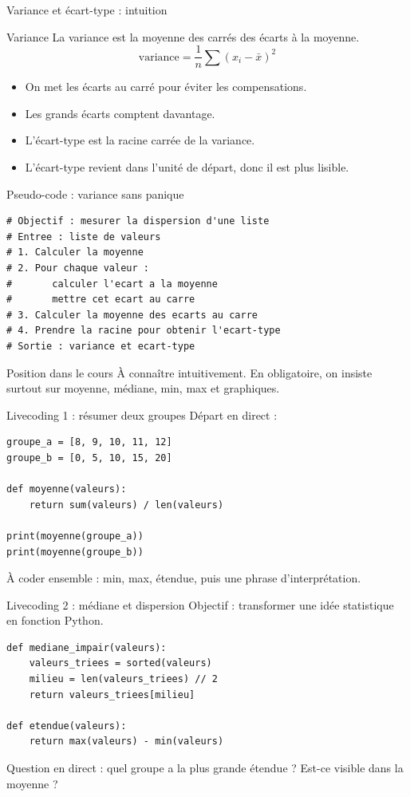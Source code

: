 \documentclass[10pt,aspectratio=169]{beamer}
\begin{document}
\begin{frame}{Variance et écart-type : intuition}
\begin{block}{Variance}
La variance est la moyenne des carrés des écarts à la moyenne.
\[
\text{variance} = \frac{1}{n}\sum (x_i - \bar{x})^2
\]
\end{block}
\begin{itemize}
  \item On met les écarts au carré pour éviter les compensations.
  \item Les grands écarts comptent davantage.
  \item L'écart-type est la racine carrée de la variance.
  \item L'écart-type revient dans l'unité de départ, donc il est plus lisible.
\end{itemize}
\end{frame}

\begin{frame}[fragile]{Pseudo-code : variance sans panique}
\begin{lstlisting}
# Objectif : mesurer la dispersion d'une liste
# Entree : liste de valeurs
# 1. Calculer la moyenne
# 2. Pour chaque valeur :
#       calculer l'ecart a la moyenne
#       mettre cet ecart au carre
# 3. Calculer la moyenne des ecarts au carre
# 4. Prendre la racine pour obtenir l'ecart-type
# Sortie : variance et ecart-type
\end{lstlisting}
\begin{block}{Position dans le cours}
À connaître intuitivement. En obligatoire, on insiste surtout sur moyenne, médiane, min, max et graphiques.
\end{block}
\end{frame}

\begin{frame}[fragile]{Livecoding 1 : résumer deux groupes}
Départ en direct :
\begin{lstlisting}
groupe_a = [8, 9, 10, 11, 12]
groupe_b = [0, 5, 10, 15, 20]

def moyenne(valeurs):
    return sum(valeurs) / len(valeurs)

print(moyenne(groupe_a))
print(moyenne(groupe_b))
\end{lstlisting}
À coder ensemble : min, max, étendue, puis une phrase d'interprétation.
\end{frame}

\begin{frame}[fragile]{Livecoding 2 : médiane et dispersion}
Objectif : transformer une idée statistique en fonction Python.
\begin{lstlisting}
def mediane_impair(valeurs):
    valeurs_triees = sorted(valeurs)
    milieu = len(valeurs_triees) // 2
    return valeurs_triees[milieu]

def etendue(valeurs):
    return max(valeurs) - min(valeurs)
\end{lstlisting}
Question en direct : quel groupe a la plus grande étendue ? Est-ce visible dans la moyenne ?
\end{frame}
\end{document}
